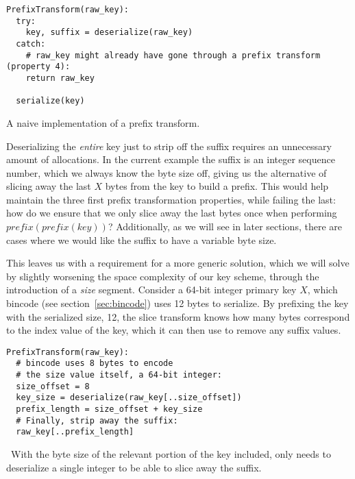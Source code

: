 \begin{listing}[H]
  \begin{verbatim}
PrefixTransform(raw_key):
  try:
    key, suffix = deserialize(raw_key)
  catch:
    # raw_key might already have gone through a prefix transform (property 4):
    return raw_key

  serialize(key)
  \end{verbatim}

  \caption{A naive implementation of a prefix transform.}\label{lst:naive-prefix}
\end{listing}

Deserializing the \textit{entire} key just to strip off the suffix requires an
unnecessary amount of allocations. In the current example the suffix is an
integer sequence number, which we always know the byte size off, giving us the
alternative of slicing away the last $ X $ bytes from the key to build a prefix.
This would help maintain the three first prefix transformation properties, while
failing the last: how do we ensure that we only slice away the last bytes once
when performing $ prefix(prefix(key)) $? Additionally, as we will see in later
sections, there are cases where we would like the suffix to have a variable byte
size.

This leaves us with a requirement for a more generic solution, which we will
solve by slightly worsening the space complexity of our key scheme, through the
introduction of a \textit{size} segment. Consider a 64-bit integer primary key $
X $, which bincode (see section~\ref{sec:bincode}) uses 12 bytes to serialize.
By prefixing the key with the serialized size, 12, the slice transform knows how
many bytes correspond to the index value of the key, which it can then use to
remove any suffix values.

\begin{listing}[H]
  \begin{verbatim}
PrefixTransform(raw_key):
  # bincode uses 8 bytes to encode
  # the size value itself, a 64-bit integer:
  size_offset = 8
  key_size = deserialize(raw_key[..size_offset])
  prefix_length = size_offset + key_size
  # Finally, strip away the suffix:
  raw_key[..prefix_length]
  \end{verbatim}

  \caption{\
    With the byte size of the relevant portion of the key included,
    \code{PrefixTransform} only needs to deserialize a single integer to be able
    to slice away the suffix.
  }\label{lst:better-prefix}
\end{listing}



